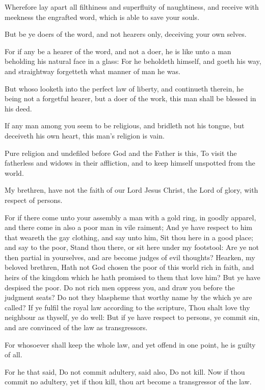 \Verse Wherefore lay apart all filthiness and superfluity of naughtiness, and receive with meekness the engrafted word, which is able to save your souls.

\Verse But be ye doers of the word, and not hearers only, deceiving your own selves.

\Verse For if any be a hearer of the word, and not a doer, he is like unto a man beholding his natural face in a glass: \Verse For he beholdeth himself, and goeth his way, and straightway forgetteth what manner of man he was.

\Verse But whoso looketh into the perfect law of liberty, and continueth therein, he being not a forgetful hearer, but a doer of the work, this man shall be blessed in his deed.

\Verse If any man among you seem to be religious, and bridleth not his tongue, but deceiveth his own heart, this man's religion is vain.

\Verse Pure religion and undefiled before God and the Father is this, To visit the fatherless and widows in their affliction, and to keep himself unspotted from the world.


\Chapter
\Verse My brethren, have not the faith of our Lord Jesus Christ, the Lord of glory, with respect of persons.

\Verse For if there come unto your assembly a man with a gold ring, in goodly apparel, and there come in also a poor man in vile raiment; \Verse And ye have respect to him that weareth the gay clothing, and say unto him, Sit thou here in a good place; and say to the poor, Stand thou there, or sit here under my footstool: \Verse Are ye not then partial in yourselves, and are become judges of evil thoughts?  \Verse Hearken, my beloved brethren, Hath not God chosen the poor of this world rich in faith, and heirs of the kingdom which he hath promised to them that love him?  \Verse But ye have despised the poor. Do not rich men oppress you, and draw you before the judgment seats?  \Verse Do not they blaspheme that worthy name by the which ye are called?  \Verse If ye fulfil the royal law according to the scripture, Thou shalt love thy neighbour as thyself, ye do well: \Verse But if ye have respect to persons, ye commit sin, and are convinced of the law as transgressors.

\Verse For whosoever shall keep the whole law, and yet offend in one point, he is guilty of all.

\Verse For he that said, Do not commit adultery, said also, Do not kill.  Now if thou commit no adultery, yet if thou kill, thou art become a transgressor of the law.

